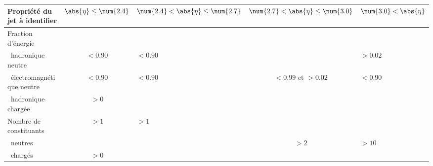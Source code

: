 \begin{tabularx}{\textwidth}{lcYcY}
\toprule
Propriété du jet à identifier & $\abs{\eta}\leq\num{2.4}$ & $\num{2.4}<\abs{\eta}\leq\num{2.7}$ & $\num{2.7}<\abs{\eta}\leq\num{3.0}$ & $\num{3.0}<\abs{\eta}$ \\
\midrule
Fraction d'énergie\\
\ hadronique neutre & $<\num{0.90}$ & $<\num{0.90}$ &  & $>\num{0.02}$ \\
\ électromagnétique neutre & $<\num{0.90}$ & $<\num{0.90}$ & $<\num{0.99}$ et $>\num{0.02}$ & $<\num{0.90}$ \\
\ hadronique chargée & $>\num{0}$ &&&\\
\midrule
Nombre de constituants & $>\num{1}$ & $>\num{1}$\\
\ neutres & & & $>\num{2}$ & $>\num{10}$ \\
\ chargés & $>\num{0}$ &&&\\
\bottomrule
\end{tabularx}
